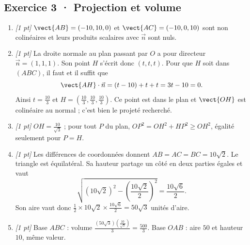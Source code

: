 \subsection*{Exercice 3 · Projection et volume}\begin{enumerate}

\item \textit{[1 pt]} $\vect{AB}=(-10,10,0)$ et $\vect{AC}=(-10,0,10)$ sont non colinéaires et leurs produits scalaires avec $\vec n$ sont nuls.

\item \textit{[1 pt]} La droite normale au plan passant par $O$ a pour directeur $\vec n=(1,1,1)$. Son point $H$ s'écrit donc $(t,t,t)$. Pour que $H$ soit dans $(ABC)$, il faut et il suffit que
\[\vect{AH}\cdot\vec n=(t-10)+t+t=3t-10=0.\]
Ainsi $t=\frac{10}{3}$ et $H=(\frac{10}{3},\frac{10}{3},\frac{10}{3})$. Ce point est dans le plan et $\vect{OH}$ est colinéaire au normal ; c'est bien le projeté recherché.

\item \textit{[1 pt]} $OH=\frac{10}{\sqrt{3}}$ ; pour tout $P$ du plan, $OP^2=OH^2+HP^2\ge OH^2$, égalité seulement pour $P=H$.

\item \textit{[1 pt]} Les différences de coordonnées donnent $AB=AC=BC=10\sqrt2$. Le triangle est équilatéral. Sa hauteur partage un côté en deux parties égales et vaut
\[\sqrt{(10\sqrt2)^2-(\frac{10\sqrt{2}}{2})^2}=\frac{10\sqrt6}{2}.\]
Son aire vaut donc $\frac12\times 10\sqrt2\times\frac{10\sqrt6}{2}=50\sqrt3$ unités d'aire.

\item \textit{[1 pt]} Base $ABC$ : volume $\frac{(50\sqrt3)(\frac{10}{\sqrt{3}})}{3}=\frac{500}{3}$. Base $OAB$ : aire $50$ et hauteur $10$, même valeur.

\end{enumerate}

